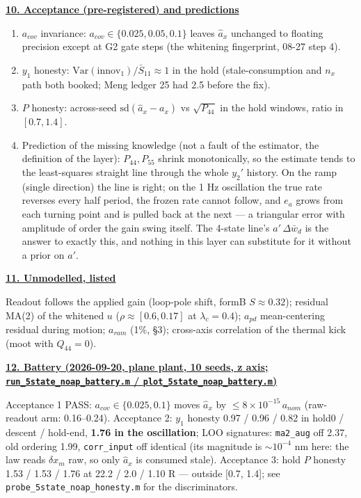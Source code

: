 \documentclass[11pt,a4paper]{ctexart}
\newcommand{\lc}{\lambda_c}
\newcommand{\hd}[1]{\par\medskip\noindent\underline{\textbf{#1}}\par\nobreak\vspace{0.2ex}}
\begin{document}
\hd{10. Acceptance (pre-registered) and predictions}
\begin{enumerate}[nosep]
\item $a_{cov}$ invariance: $a_{cov} \in \{0.025, 0.05, 0.1\}$ leaves $\hat a_x$ unchanged to floating precision except at G2 gate steps (the whitening fingerprint, 08-27 step 4).
\item $y_1$ honesty: $\mathrm{Var}(\mathrm{innov}_1)/\bar S_{11} \approx 1$ in the hold (stale-consumption and $n_x$ path both booked; Meng ledger 25 had 2.5 before the fix).
\item $P$ honesty: across-seed $\mathrm{sd}(\hat a_x - a_x)$ vs $\sqrt{P_{44}}$ in the hold windows, ratio in $[0.7, 1.4]$.
\item Prediction of the missing knowledge (not a fault of the estimator, the definition of the layer): $P_{44}, P_{55}$ shrink monotonically, so the estimate tends to the least-squares straight line through the whole $y_2'$ history. On the ramp (single direction) the line is right; on the 1 Hz oscillation the true rate reverses every half period, the frozen rate cannot follow, and $e_a$ grows from each turning point and is pulled back at the next --- a triangular error with amplitude of order the gain swing itself. The 4-state line's $a'\,\Delta\bar w_d$ is the answer to exactly this, and nothing in this layer can substitute for it without a prior on $a'$.
\end{enumerate}

\hd{11. Unmodelled, listed}
Readout follows the applied gain (loop-pole shift, formB $S \approx 0.32$); residual MA(2) of the whitened $u$ ($\rho \approx [0.6, 0.17]$ at $\lc = 0.4$); $a_{pd}$ mean-centering residual during motion; $a_{ram}$ (1\%, \S 3); cross-axis correlation of the thermal kick (moot with $Q_{44} = 0$).

\newpage
\hd{12. Battery (2026-09-20, plane plant, 10 seeds, z axis; \texttt{run\_5state\_noap\_battery.m} / \texttt{plot\_5state\_noap\_battery.m})}
Acceptance 1 PASS: $a_{cov} \in \{0.025, 0.1\}$ moves $\hat a_x$ by $\le 8\times10^{-15}\,a_{nom}$ (raw-readout arm: 0.16--0.24). Acceptance 2: $y_1$ honesty 0.97 / 0.96 / 0.82 in hold0 / descent / hold-end, \textbf{1.76 in the oscillation}; LOO signatures: \texttt{ma2\_aug} off 2.37, old ordering 1.99, \texttt{corr\_input} off identical (its magnitude is $\sim 10^{-4}$ nm here: the law reads $\delta x_m$ raw, so only $\hat a_x$ is consumed stale). Acceptance 3: hold $P$ honesty 1.53 / 1.53 / 1.76 at 22.2 / 2.0 / 1.10 R --- outside [0.7, 1.4]; see \texttt{probe\_5state\_noap\_honesty.m} for the discriminators.
\end{document}
